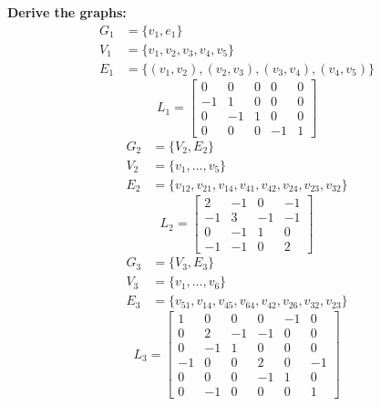 \textbf{Derive the graphs:}           \\
\begin{equation}
  \begin{split}
    G_1 & = \{ v_1, e_1 \}            \\
    V_1 & = \{ v_1,v_2,v_3,v_4,v_5 \} \\
    E_1 & = \{ (v_1,v_2),(v_2,v_3),(v_3,v_4),(v_4,v_5) \}
  \end{split}
\end{equation}
\begin{equation}
L_1 = 
  \begin{bmatrix}
    0   & 0  & 0  & 0  & 0            \\
    -1  & 1  & 0  & 0  & 0            \\
    0   & -1 & 1  & 0  & 0            \\
    0   & 0  & 0  & -1 & 1 
  \end{bmatrix}
\end{equation}
\begin{equation}
  \begin{split}
    G_2 & = \{ V_2,E_2 \}             \\
    V_2 & = \{ v_1,\ldots,v_5 \}      \\
    E_2 & = \{ v_{12}, v_{21}, v_{14}, v_{41}, v_{42}, v_{24}, v_{23}, v_{32} \}
  \end{split}
\end{equation}
\begin{equation}
  L_2 = 
  \begin{bmatrix}
    2   & -1 & 0  & -1                \\
    -1  & 3  & -1 & -1                \\
    0   & -1 & 1  & 0                 \\
    -1  & -1 & 0  & 2
  \end{bmatrix}
\end{equation}
\begin{equation}
  \begin{split}
    G_3 & = \{ V_3,E_3 \}             \\
    V_3 & = \{ v_1,\ldots,v_6 \}      \\
    E_3 & = \{ v_{51}, v_{14}, v_{45}, v_{64},v_{42},v_{26},v_{32},v_{23} \}
  \end{split}
\end{equation}
\begin{equation}
  L_3 = 
  \begin{bmatrix}
    1   & 0  & 0  & 0  & -1 & 0       \\
    0   & 2  & -1 & -1 & 0  & 0       \\
    0   & -1 & 1  & 0  & 0  & 0       \\
    -1  & 0  & 0  & 2  & 0  & -1      \\
    0   & 0  & 0  & -1 & 1  & 0       \\
    0   & -1 & 0  & 0  & 0  & 1
  \end{bmatrix}
\end{equation}

